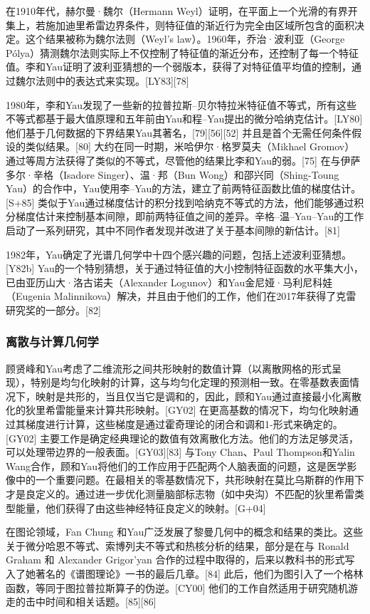 在1910年代，赫尔曼·魏尔（Hermann Weyl）证明，在平面上一个光滑的有界开集上，若施加迪里希雷边界条件，则特征值的渐近行为完全由区域所包含的面积决定。这个结果被称为魏尔法则（Weyl's law）。1960年，乔治·波利亚（George Pólya）猜测魏尔法则实际上不仅控制了特征值的渐近分布，还控制了每一个特征值。李和Yau证明了波利亚猜想的一个弱版本，获得了对特征值平均值的控制，通过魏尔法则中的表达式来实现。[LY83][78]

1980年，李和Yau发现了一些新的拉普拉斯–贝尔特拉米特征值不等式，所有这些不等式都基于最大值原理和五年前由Yau和程–Yau提出的微分哈纳克估计。[LY80] 他们基于几何数据的下界结果Yau其著名，[79][56][52] 并且是首个无需任何条件假设的类似结果。[80] 大约在同一时期，米哈伊尔·格罗莫夫（Mikhael Gromov）通过等周方法获得了类似的不等式，尽管他的结果比李和Yau的弱。[75] 在与伊萨多尔·辛格（Isadore Singer）、温·邦（Bun Wong）和邵兴同（Shing-Toung Yau）的合作中，Yau使用李–Yau的方法，建立了前两特征函数比值的梯度估计。[S+85] 类似于Yau通过梯度估计的积分找到哈纳克不等式的方法，他们能够通过积分梯度估计来控制基本间隙，即前两特征值之间的差异。辛格–温–Yau–Yau的工作启动了一系列研究，其中不同作者发现并改进了关于基本间隙的新估计。[81]

1982年，Yau确定了光谱几何学中十四个感兴趣的问题，包括上述波利亚猜想。[Y82b] Yau的一个特别猜想，关于通过特征值的大小控制特征函数的水平集大小，已由亚历山大·洛古诺夫（Alexander Logunov）和Yau金尼娅·马利尼科娃（Eugenia Malinnikova）解决，并且由于他们的工作，他们在2017年获得了克雷研究奖的一部分。[82]
\subsubsection{离散与计算几何学}
顾贤峰和Yau考虑了二维流形之间共形映射的数值计算（以离散网格的形式呈现），特别是均匀化映射的计算，这与均匀化定理的预测相一致。在零基数表面情况下，映射是共形的，当且仅当它是调和的，因此，顾和Yau通过直接最小化离散化的狄里希雷能量来计算共形映射。[GY02] 在更高基数的情况下，均匀化映射通过其梯度进行计算，这些梯度是通过霍奇理论的闭合和调和1-形式来确定的。[GY02] 主要工作是确定经典理论的数值有效离散化方法。他们的方法足够灵活，可以处理带边界的一般表面。[GY03][83] 与Tony Chan、Paul Thompson和Yalin Wang合作，顾和Yau将他们的工作应用于匹配两个人脑表面的问题，这是医学影像中的一个重要问题。在最相关的零基数情况下，共形映射在莫比乌斯群的作用下才是良定义的。通过进一步优化测量脑部标志物（如中央沟）不匹配的狄里希雷类型能量，他们获得了由这些神经特征良定义的映射。[G+04]

在图论领域，Fan Chung 和Yau广泛发展了黎曼几何中的概念和结果的类比。这些关于微分哈恩不等式、索博列夫不等式和热核分析的结果，部分是在与 Ronald Graham 和 Alexander Grigor'yan 合作的过程中取得的，后来以教科书的形式写入了她著名的《谱图理论》一书的最后几章。[84] 此后，他们为图引入了一个格林函数，等同于图拉普拉斯算子的伪逆。[CY00] 他们的工作自然适用于研究随机游走的击中时间和相关话题。[85][86]

